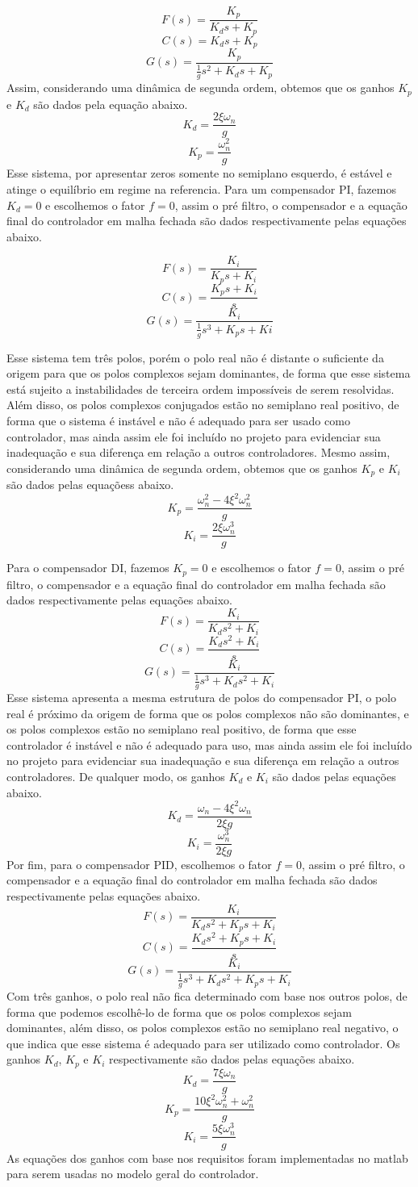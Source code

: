 \documentclass[a4paper, 12pt]{article} %
\begin{document}
\[F(s)=\frac{K_p}{K_ds+K_p}\]
\[C(s)=K_ds+K_p\]
\[G(s)=\frac{K_p}{\frac{1}{g}s^2+K_ds+K_p}\]
Assim, considerando uma dinâmica de segunda ordem, obtemos que os ganhos $K_p$ e $K_d$ são dados pela equação abaixo.
\[K_d=\frac{2\xi\omega_n}{g}\]
\[K_p=\frac{\omega_n^2}{g}\]
Esse sistema, por apresentar zeros somente no semiplano esquerdo, é estável e atinge o equilíbrio em regime na referencia. Para um compensador PI, fazemos $K_d=0$ e escolhemos o fator $f=0$, assim o pré filtro, o compensador e a equação final do controlador em malha fechada são dados respectivamente pelas equações abaixo.

\[F(s)=\frac{K_i}{K_ps+K_i}\]
\[C(s)=\frac{K_ps+K_i}{s}\]
\[G(s)=\frac{K_i}{\frac{1}{g}s^3+K_ps+Ki}\]

Esse sistema tem três polos, porém o polo real não é distante o suficiente da origem para que os polos complexos sejam dominantes, de forma que esse sistema está sujeito a instabilidades de terceira ordem impossíveis de serem resolvidas. Além disso, os polos complexos conjugados estão no semiplano real positivo, de forma que o sistema é instável e não é adequado para ser usado como controlador, mas ainda assim ele foi incluído no projeto para evidenciar sua inadequação e sua diferença em relação a outros controladores. Mesmo assim, considerando uma dinâmica de segunda ordem, obtemos que os ganhos $K_p$ e $K_i$ são dados pelas equaçõess abaixo.
\[K_p=\frac{\omega_n^2-4\xi^2\omega_n^2}{g}\]
\[K_i=\frac{2\xi\omega_n^3}{g}\]

Para o compensador DI, fazemos $K_p=0$ e escolhemos o fator $f=0$, assim o pré filtro, o compensador e a equação final do controlador em malha fechada são dados respectivamente pelas equações abaixo.
\[F(s)=\frac{K_i}{K_ds^2+K_i}\]
\[C(s)=\frac{K_ds^2+K_i}{s}\]
\[G(s)=\frac{K_i}{\frac{1}{g}s^3+K_ds^2+K_i}\]
Esse sistema apresenta a mesma estrutura de polos do compensador PI, o polo real é próximo da origem de forma que os polos complexos não são dominantes, e os polos complexos estão no semiplano real positivo, de forma que esse controlador é instável e não é adequado para uso, mas ainda assim ele foi incluído no projeto para evidenciar sua inadequação e sua diferença em relação a outros controladores. De qualquer modo, os ganhos $K_d$ e $K_i$ são dados pelas equações abaixo.
\[K_d=\frac{\omega_n-4\xi^2\omega_n}{2\xi g}\]
\[K_i=\frac{\omega_n^3}{2\xi g}\]
Por fim, para o compensador PID, escolhemos o fator $f=0$, assim o pré filtro, o compensador e a equação final do controlador em malha fechada são dados respectivamente pelas equações abaixo.
\[F(s)=\frac{K_i}{K_ds^2+K_ps+K_i}\]
\[C(s)=\frac{K_ds^2+K_ps+K_i}{s}\]
\[G(s)=\frac{K_i}{\frac{1}{g}s^3+K_ds^2+K_ps+K_i}\]
Com três ganhos, o polo real não fica determinado com base nos outros polos, de forma que podemos escolhê-lo de forma que os polos complexos sejam dominantes, além disso, os polos complexos estão no semiplano real negativo, o que indica que esse sistema é adequado para ser utilizado como controlador. Os ganhos $K_d$, $K_p$ e $K_i$ respectivamente são dados pelas equações abaixo.
\[K_d=\frac{7\xi\omega_n}{g}\]
\[K_p=\frac{10\xi^2\omega_n^2+\omega_n^2}{g}\]
\[K_i=\frac{5\xi\omega_n^3}{g}\]
As equações dos ganhos com base nos requisitos foram implementadas no matlab para serem usadas no modelo geral do controlador.
\end{document}
